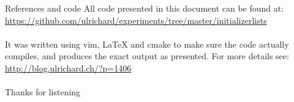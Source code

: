 \documentclass[11pt]{beamer}
\begin{document}
\begin{frame}{References and code}
All code presented in this document can be found at:\\
\href{https://github.com/ulrichard/experiments/tree/master/initializerlists}{https://github.com/ulrichard/experiments/tree/master/initializerlists}\\
\\[0.5cm]
It was written using vim, LaTeX and cmake to make sure the code actually compiles, and produces the exact output as presented. For more details see:\\
\href{http://blog.ulrichard.ch/?p=1406}{http://blog.ulrichard.ch/?p=1406}\\
\\[0.5cm]
Thanks for listening
\end{frame}
\end{document}
